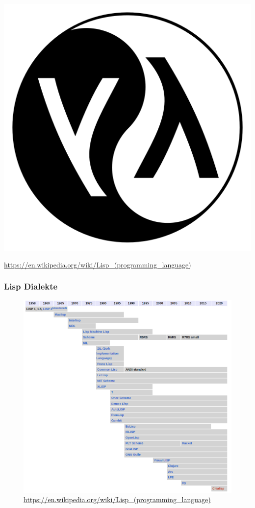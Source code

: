 \documentclass{beamer}
\begin{document}
\begin{frame}
		\includegraphics[scale=0.1]{bilder/lisp.png}
	   
	\textmd{\url{https://en.wikipedia.org/wiki/Lisp_(programming_language)}}
\end{frame}

\begin{frame}
\frametitle{Lisp Dialekte}
	\begin{figure}
	    \centering
	    \includegraphics[width=0.7\linewidth]{bilder/lisphis.png}
            \textmd{ \tiny \url{https://en.wikipedia.org/wiki/Lisp_(programming_language)}}
	\end{figure}
\end{frame}
\end{document}
